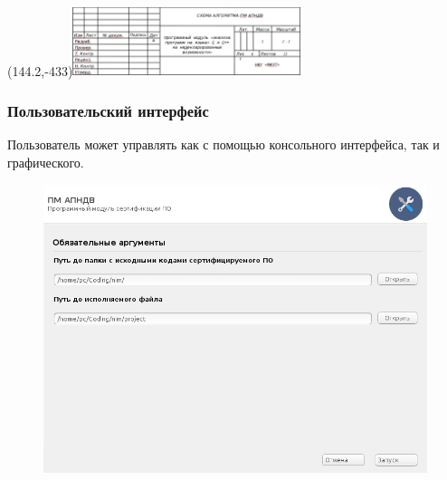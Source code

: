 \begin{frame}%
\frametitle{}

    \Put(144.2,-433){\includegraphics[height=2cm]{Presentation/images/algo_gost.png}}

    \begin{figure}[!htbp]
        \vspace{-9ex} 
        \hspace{-13cm} 
        \begin{adjustbox}{max totalsize={1.6\textwidth}{1.6\textheight},left}
            
        \end{adjustbox}
    \end{figure}
\end{frame}

\begin{frame}%
\frametitle{Пользовательский интерфейс {\ProgModule}}
    Пользователь может управлять {\ProgModule} как с помощью
    консольного интерфейса, так и графического.
    \begin{figure}[!htbp]
        \begin{adjustbox}{max totalsize={0.8\textwidth}{0.8\textheight}}
            \includegraphics[trim={0.2em 0.2ex 0.2ex 0.2ex},clip,width=\linewidth]{images/apndv-gui.png}
        \end{adjustbox}
    \end{figure}

\end{frame}

